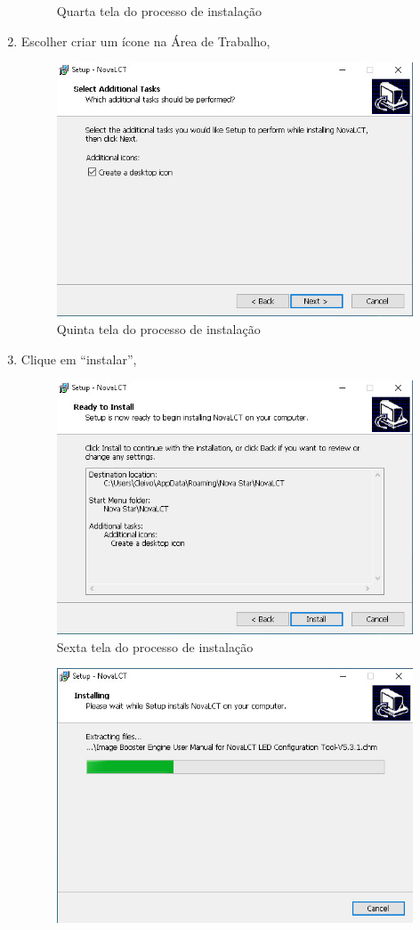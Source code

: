 \documentclass[12pt, a4paper]{article}
\begin{document}
\begin{enumerate}
\begin{figure}[!htb]
			\caption{Quarta tela do processo de instalação}
		\end{figure}
	\item Escolher criar um ícone na Área de Trabalho,
		\begin{figure}[!htb]
			\centering
			\includegraphics[width=.8\textwidth]{D5.jpeg}
			\caption{Quinta tela do processo de instalação}
		\end{figure}
		\newpage
	\item Clique em ``instalar'',
		\begin{figure}[!htb]
			\centering
			\includegraphics[width=.8\textwidth]{D6.jpeg}
			\caption{Sexta tela do processo de instalação}
		\end{figure}
		\begin{figure}[!htb]
			\centering
			\includegraphics[width=.8\textwidth]{D7.jpeg}

\end{figure}
\end{enumerate}
\end{document}
